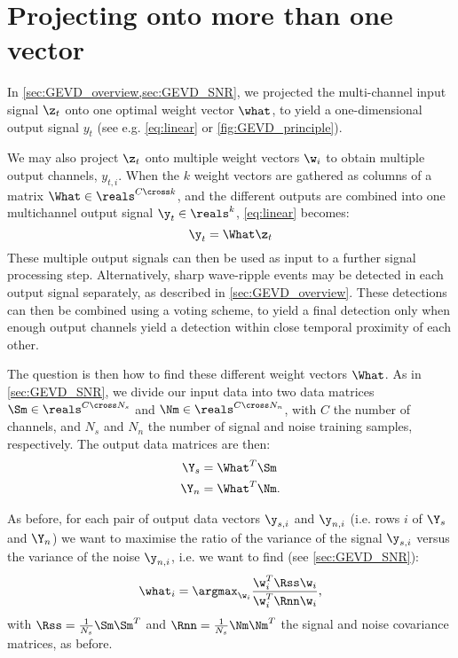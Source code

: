 
\section{Projecting onto more than one vector}


In \cref{sec:GEVD_overview,sec:GEVD_SNR}, we projected the multi-channel
input signal $\z_t$ onto one optimal weight vector $\what$, to yield a
one-dimensional output signal $y_t$ (see e.g. \cref{eq:linear} or
\cref{fig:GEVD_principle}).

We may also project $\z_t$ onto multiple weight vectors $\w_i$ to obtain
multiple output channels, $y_{t,i}$. When the $k$ weight vectors are gathered
as columns of a matrix $\What \in \reals^{C \cross k}$, and the different
outputs are combined into one multichannel output signal $\y_t \in \reals^k$,
\cref{eq:linear} becomes:
\[
\y_t = \What \z_t
\]
These multiple output signals can then be used as input to a further signal
processing step. Alternatively, sharp wave-ripple events may be detected in
each output signal separately, as described in \cref{sec:GEVD_overview}.
These detections can then be combined using a voting scheme, to yield a final
detection only when enough output channels yield a detection within close
temporal proximity of each other.

The question is then how to find these different weight vectors $\What$. As
in \cref{sec:GEVD_SNR}, we divide our input data into two data matrices $\Sm
\in \reals^{C \cross N_s}$ and $\Nm \in \reals^{C \cross N_n}$, with $C$ the
number of channels, and $N_s$ and $N_n$ the number of signal and noise
training samples, respectively. The output data matrices are then:
\begin{align*}
\Y_s &= \What^T \Sm \\
\Y_n &= \What^T \Nm.
\end{align*}

As before, for each pair of output data vectors $\y_{s,i}$ and $\y_{n,i}$
(i.e. rows $i$ of $\Y_s$ and $\Y_n$) we want to maximise the ratio of the
variance of the signal $\y_{s,i}$ versus the variance of the noise
$\y_{n,i}$, i.e. we want to find (see \cref{sec:GEVD_SNR}):
%
\begin{equation}
\label{eq:maxwi}
\what_i = \argmax_{\w_i} \frac{\w_i^T \Rss \w_i}
                              {\w_i^T \Rnn \w_i},
\end{equation}
% 
with $\Rss = \frac{1}{N_s} \Sm \Sm^T$ and $\Rnn = \frac{1}{N_s} \Nm \Nm^T$
the signal and noise covariance matrices, as before.

